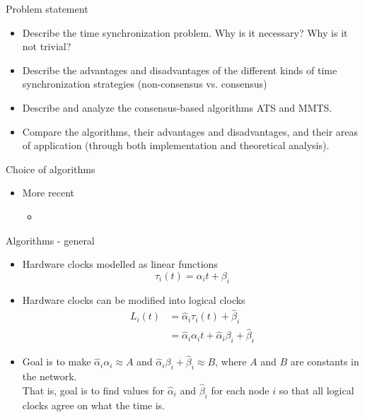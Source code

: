 \documentclass{beamer}
\begin{document}
\begin{frame}{Problem statement}
\begin{itemize}
    \item Describe the time synchronization problem. Why is it necessary? Why is it not trivial? 
    \item Describe the advantages and disadvantages of the different kinds of time synchronization strategies (non-consensus vs. consensus)
    \item Describe and analyze the consensus-based algorithms ATS and MMTS.
    \item Compare the algorithms, their advantages and disadvantages, and their areas of application (through both implementation and theoretical analysis).
\end{itemize}

\end{frame}
 
\begin{frame}{Choice of algorithms}
    \begin{itemize}
        \item More recent
        \begin{itemize}
            \item 
        \end{itemize}
    \end{itemize}
\end{frame}
 
\begin{frame}{Algorithms - general}
    \begin{itemize}
        \item Hardware clocks modelled as linear functions $$ \tau_i(t) = \alpha_i t + \beta_i $$
        \item Hardware clocks can be modified into logical clocks
        \begin{align*}
            L_i(t) &= \hat{\alpha}_i \tau_i(t) + \hat{\beta}_i \\
                    &= \hat{\alpha}_i \alpha_i t + \hat{\alpha}_i \beta_i + \hat{\beta}_i
        \end{align*}
        \item Goal is to make $\hat{\alpha}_i \alpha_i \approx A$ and $\hat{\alpha}_i \beta_i + \hat{\beta}_i \approx B$, where $A$ and $B$ are constants in the network.\\
        That is, goal is to find values for $\hat{\alpha}_i$ and $\hat{\beta}_i$ for each node $i$ so that all logical clocks agree on what the time is.
    \end{itemize}
\end{frame}
\end{document}
